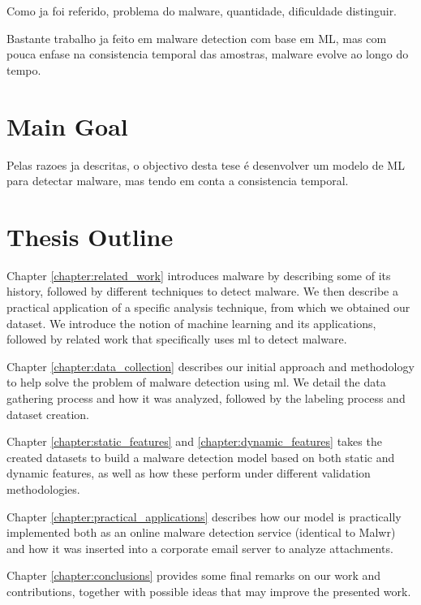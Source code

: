 Como ja foi referido, problema do malware, quantidade, dificuldade distinguir.

Bastante trabalho ja feito em malware detection com base em ML, mas com pouca enfase na consistencia temporal das amostras, malware evolve ao longo do tempo.

\section{Main Goal}
\label{section:overview}

Pelas razoes ja descritas, o objectivo desta tese é desenvolver um modelo de ML para detectar malware, mas tendo em conta a consistencia temporal.


\section{Thesis Outline}
\label{section:outline}

Chapter \ref{chapter:related_work} introduces malware by describing some of its history, followed by different techniques to detect malware. We then describe a practical application of a specific analysis technique, from which we obtained our dataset.
We introduce the notion of machine learning and its applications, followed by related work that specifically uses \gls{ml} to detect malware. 

Chapter \ref{chapter:data_collection} describes our initial approach and methodology to help solve the problem of malware detection using \gls{ml}. We detail the data gathering process and how it was analyzed, followed by the labeling process and dataset creation.

Chapter \ref{chapter:static_features} and \ref{chapter:dynamic_features} takes the created datasets to build a malware detection model based on both static and dynamic features, as well as how these perform under different validation methodologies.

Chapter \ref{chapter:practical_applications} describes how our model is practically implemented both as an online malware detection service (identical to Malwr) and how it was inserted into a corporate email server to analyze attachments.

Chapter \ref{chapter:conclusions} provides some final remarks on our work and contributions, together with possible ideas that may improve the presented work.
